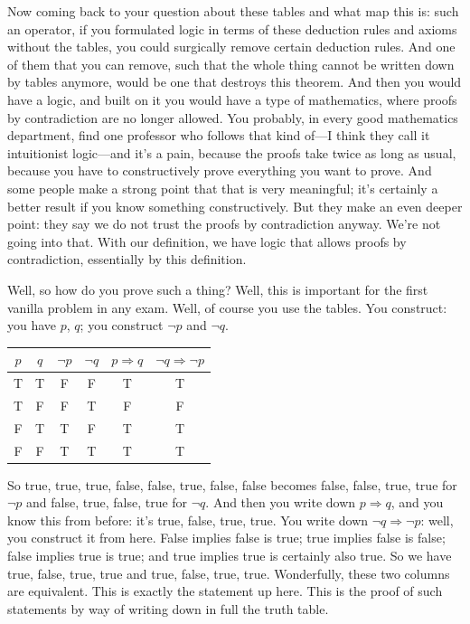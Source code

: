 Now coming back to your question about these tables and what map this is: such an operator, if you formulated logic in terms of these deduction rules and axioms without the tables, you could surgically remove certain deduction rules. And one of them that you can remove, such that the whole thing cannot be written down by tables anymore, would be one that destroys this theorem. And then you would have a logic, and built on it you would have a type of mathematics, where proofs by contradiction are no longer allowed. You probably, in every good mathematics department, find one professor who follows that kind of---I think they call it intuitionist logic---and it's a pain, because the proofs take twice as long as usual, because you have to constructively prove everything you want to prove. And some people make a strong point that that is very meaningful; it's certainly a better result if you know something constructively. But they make an even deeper point: they say we do not trust the proofs by contradiction anyway. We're not going into that. With our definition, we have logic that allows proofs by contradiction, essentially by this definition.

Well, so how do you prove such a thing? Well, this is important for the first vanilla problem in any exam. Well, of course you use the tables. You construct: you have $p$, $q$; you construct $\lnot p$ and $\lnot q$.

\begin{center}
\begin{tabular}{cccc|c|c}
$p$ & $q$ & $\lnot p$ & $\lnot q$ & $p \Rightarrow q$ & $\lnot q \Rightarrow \lnot p$ \\
\hline
T & T & F & F & T & T \\
T & F & F & T & F & F \\
F & T & T & F & T & T \\
F & F & T & T & T & T \\
\end{tabular}
\end{center}

So true, true, true, false, false, true, false, false becomes false, false, true, true for $\lnot p$ and false, true, false, true for $\lnot q$. And then you write down $p \Rightarrow q$, and you know this from before: it's true, false, true, true. You write down $\lnot q \Rightarrow \lnot p$: well, you construct it from here. False implies false is true; true implies false is false; false implies true is true; and true implies true is certainly also true. So we have true, false, true, true and true, false, true, true. Wonderfully, these two columns are equivalent. This is exactly the statement up here. This is the proof of such statements by way of writing down in full the truth table.

